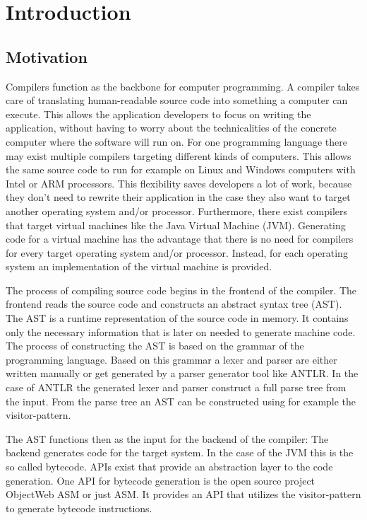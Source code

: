 \chapter{Introduction}
\label{cha:introduction}

\section{Motivation}

Compilers function as the backbone for computer programming. A compiler takes care of translating human-readable source code into something a computer can execute. This allows the application developers to focus on writing the application, without having to worry about the technicalities of the concrete computer where the software will run on. For one programming language there may exist multiple compilers targeting different kinds of computers. This allows the same source code to run for example on Linux and Windows computers with Intel or ARM processors. This flexibility saves developers a lot of work, because they don't need to rewrite their application in the case they also want to target another operating system and/or processor. Furthermore, there exist compilers that target virtual machines like the Java Virtual Machine (JVM). Generating code for a virtual machine has the advantage that there is no need for compilers for every target operating system and/or processor. Instead, for each operating system an implementation of the virtual machine is provided.

The process of compiling source code begins in the frontend of the compiler. The frontend reads the source code and constructs an abstract syntax tree (AST). The AST is a runtime representation of the source code in memory. It contains only the necessary information that is later on needed to generate machine code. The process of constructing the AST is based on the grammar of the programming language. Based on this grammar a lexer and parser are either written manually or get generated by a parser generator tool like ANTLR. In the case of ANTLR the generated lexer and parser construct a full parse tree from the input. From the parse tree an AST can be constructed using for example the visitor-pattern. 

The AST functions then as the input for the backend of the compiler: The backend generates code for the target system. In the case of the JVM this is the so called bytecode. 
 APIs exist that provide an abstraction layer to the code generation. One API for bytecode generation is the open source project ObjectWeb ASM or just ASM. It provides an API that utilizes the visitor-pattern to generate bytecode instructions. 


